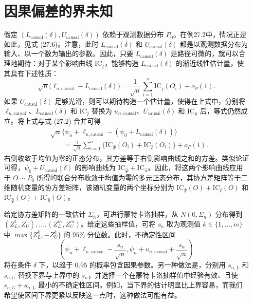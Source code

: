 \section{因果偏差的界未知}

假定 $(L_{\mathrm{causal}}(\delta),U_{\mathrm{causal}}(\delta))$ 依赖于观测数据分布 $P_0$。在例27.2中，情况正是如此，见式 (27.6)。注意，此时 $L_{\mathrm{causal}}(\delta)$ 和 $U_{\mathrm{causal}}(\delta)$ 都是以观测数据分布为输入、以一个数为输出的参数。因此，只要 $L_{\mathrm{causal}}(\delta)$ 是路径可微的，就可以合理地期待：对于某个影响曲线 $\mathrm{IC}_{\hat\ell}$，能够构造 $L_{\mathrm{causal}}(\delta)$ 的渐近线性估计量，使其具有下述性质：
\[
 \sqrt n\bigl(\ell_{n,\mathrm{causal}}-L_{\mathrm{causal}}(\delta)\bigr)
 =\frac1{\sqrt n}\sum_{i=1}^n\mathrm{IC}_{\hat\ell}(O_i)+o_P(1).
\]
如果 $U_{\mathrm{causal}}(\delta)$ 足够光滑，则可以期待构造一个估计量，使得在上式中，分别将 $\ell_{n,\mathrm{causal}}$、$L_{\mathrm{causal}}(\delta)$ 和 $\mathrm{IC}_{\hat\ell}$ 替换为 $u_{n,\mathrm{causal}}$、$U_{\mathrm{causal}}(\delta)$ 和 $\mathrm{IC}_{\hat u}$ 后，等式仍然成立。将上式与式 (27.2) 合并可得
\[
 \begin{aligned}
 &\sqrt n\bigl\{\psi_n+\ell_{n,\mathrm{causal}}-(\psi_0+L_{\mathrm{causal}}(\delta))\bigr\}\\
 &\qquad=\frac1{\sqrt n}\sum_{i=1}^n
 \bigl\{\mathrm{IC}_{\hat\Psi}(O_i)+\mathrm{IC}_{\hat\ell}(O_i)\bigr\}+o_P(1).
 \end{aligned}
\]
右侧收敛于均值为零的正态分布，其方差等于右侧影响曲线之和的方差。类似论证可得，$\psi_0+U_{\mathrm{causal}}(\delta)$ 的影响曲线为 $\mathrm{IC}_{\hat\Psi}+\mathrm{IC}_{\hat u}$。因此，将这两个影响曲线应用于 $O\sim P_0$ 所得的联合分布收敛于均值为零的多元正态分布，其协方差矩阵等于二维随机变量的协方差矩阵，该随机变量的两个坐标分别为 $\mathrm{IC}_{\hat\Psi}(O)+\mathrm{IC}_{\hat\ell}(O)$ 和 $\mathrm{IC}_{\hat\Psi}(O)+\mathrm{IC}_{\hat u}(O)$。

给定协方差矩阵的一致估计 $\Sigma_n$，可进行蒙特卡洛抽样，从 $N(0,\Sigma_n)$ 分布得到 $(Z_L^1,Z_U^1),\allowbreak\ldots,\allowbreak(Z_L^m,Z_U^m)$。给定这些抽样值，可将 $s_n$ 取为观测值 $k\in\{1,\ldots,m\}$ 中 $\max\{Z_L^k,-Z_U^k\}$ 的 $95\%$ 分位数。此时，不确定性区间
\begin{equation}
 \left(\psi_n+\ell_{n,\mathrm{causal}}-\frac{s_n}{\sqrt n},
 \psi_n+u_{n,\mathrm{causal}}+\frac{s_n}{\sqrt n}\right)
 \tag{27.8}
\end{equation}
将在条件 $\delta$ 下，以趋于 $0.95$ 的概率包含因果参数。另一种做法是，分别用 $s_{n,L}$ 和 $s_{n,U}$ 替换下界与上界中的 $s_n$，并选择一个在蒙特卡洛抽样值中经验有效、且使 $s_{n,U}+s_{n,L}$ 最小的不确定性区间。例如，当下界的估计明显比上界容易，而我们希望使区间下界更紧以反映这一点时，这种做法可能有益。

